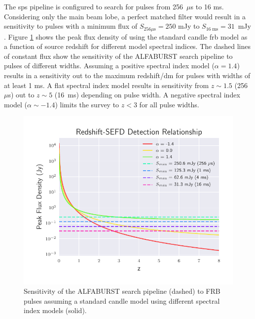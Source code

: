 \documentclass[a4paper,fleqn,usenatbib]{mnras}
\begin{document}
The \gls{sps} pipeline is configured to search for pulses from 256~$\mu$s to 16
ms. Considering only the main beam lobe, a perfect matched filter would result
in a sensitivity to pulses with a minimum flux of $S_{256 \mu\textrm{s}} = 250$
mJy to $S_{16 \; \textrm{ms}} = 31$~mJy \citep{2015MNRAS.452.1254K}. Figure
\ref{fig:fwhm_sefd_z} shows the peak flux density of using the standard candle
\gls{frb} model as a function of source redshift for different model spectral
indices. The dashed lines of constant flux show the sensitivity of the ALFABURST
search pipeline to pulses of different widths. Assuming a positive spectral
index model ($\alpha=1.4$) results in a sensitivity out to the maximum
redshift/\gls{dm} for pulses with widths of at least 1 ms. A flat spectral index
model results in sensitivity from $z \sim 1.5$ (256~$\mu$s) out to $z \sim 5$
(16~ms) depending on pulse width. A negative spectral index model ($\alpha \sim
-1.4$) limits the survey to $z < 3$ for all pulse widths.

\begin{figure}
    \includegraphics[width=1.0\linewidth]{figures/fwhm_sefd_z_relation.pdf}
    \caption{Sensitivity of the ALFABURST search pipeline (dashed) to FRB pulses
    assuming a standard candle model using different spectral index models
    (solid).
    }
    \label{fig:fwhm_sefd_z}
\end{figure}
\end{document}
